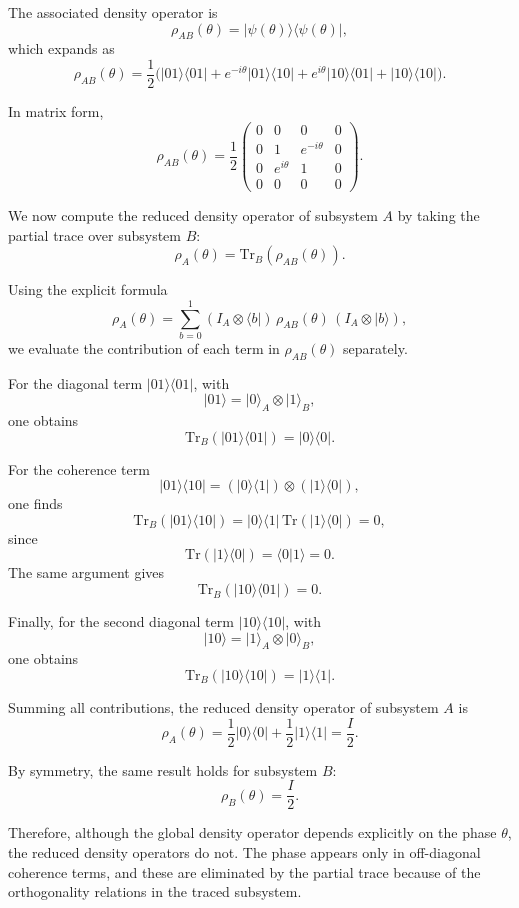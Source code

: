 \documentclass[a4paper]{article}
\begin{document}
The associated density operator is
\[
\rho_{AB}(\theta) = |\psi(\theta)\rangle\langle\psi(\theta)|,
\]
which expands as
\[
\rho_{AB}(\theta)
=
\frac{1}{2}
\Big(
|01\rangle\langle 01|
+
e^{-i\theta}|01\rangle\langle 10|
+
e^{i\theta}|10\rangle\langle 01|
+
|10\rangle\langle 10|
\Big).
\]

In matrix form,
\[
\rho_{AB}(\theta)
=
\frac{1}{2}
\begin{pmatrix}
0 & 0 & 0 & 0 \\
0 & 1 & e^{-i\theta} & 0 \\
0 & e^{i\theta} & 1 & 0 \\
0 & 0 & 0 & 0
\end{pmatrix}.
\]

We now compute the reduced density operator of subsystem $A$ by taking the partial trace over subsystem $B$:
\[
\rho_A(\theta) = \mathrm{Tr}_B(\rho_{AB}(\theta)).
\]

Using the explicit formula
\[
\rho_A(\theta)
=
\sum_{b=0}^{1}
(I_A \otimes \langle b|)\,\rho_{AB}(\theta)\,(I_A \otimes |b\rangle),
\]
we evaluate the contribution of each term in $\rho_{AB}(\theta)$ separately.

For the diagonal term $|01\rangle\langle 01|$, with
\[
|01\rangle = |0\rangle_A \otimes |1\rangle_B,
\]
one obtains
\[
\mathrm{Tr}_B(|01\rangle\langle 01|) = |0\rangle\langle 0|.
\]

For the coherence term
\[
|01\rangle\langle 10|
=
(|0\rangle\langle 1|)\otimes(|1\rangle\langle 0|),
\]
one finds
\[
\mathrm{Tr}_B(|01\rangle\langle 10|)
=
|0\rangle\langle 1|\,\mathrm{Tr}(|1\rangle\langle 0|)
=
0,
\]
since
\[
\mathrm{Tr}(|1\rangle\langle 0|)=\langle 0|1\rangle = 0.
\]
The same argument gives
\[
\mathrm{Tr}_B(|10\rangle\langle 01|) = 0.
\]

Finally, for the second diagonal term $|10\rangle\langle 10|$, with
\[
|10\rangle = |1\rangle_A \otimes |0\rangle_B,
\]
one obtains
\[
\mathrm{Tr}_B(|10\rangle\langle 10|) = |1\rangle\langle 1|.
\]

Summing all contributions, the reduced density operator of subsystem $A$ is
\[
\rho_A(\theta)
=
\frac{1}{2}|0\rangle\langle 0|
+
\frac{1}{2}|1\rangle\langle 1|
=
\frac{I}{2}.
\]

By symmetry, the same result holds for subsystem $B$:
\[
\rho_B(\theta) = \frac{I}{2}.
\]

Therefore, although the global density operator depends explicitly on the phase $\theta$, the reduced density operators do not. The phase appears only in off-diagonal coherence terms, and these are eliminated by the partial trace because of the orthogonality relations in the traced subsystem.
\end{document}
